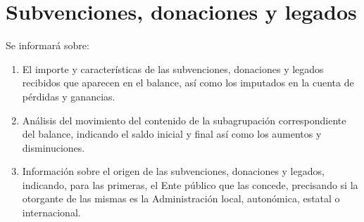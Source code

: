 \documentclass[11pt,a4paper]{article}
\begin{document}
\section{Subvenciones, donaciones y legados}
Se informará sobre:
\begin{enumerate}
 \item El importe y características de las subvenciones, donaciones y legados recibidos que aparecen en el balance, así como los imputados en la cuenta de pérdidas y ganancias.

 \item Análisis del movimiento del contenido de la subagrupación correspondiente del balance, indicando el saldo inicial y final así como los aumentos y disminuciones.

 \item Información sobre el origen de las subvenciones, donaciones y legados, indicando, para las primeras, el Ente público que las concede, precisando si la otorgante de las mismas es la Administración local, autonómica, estatal o internacional.
\end{enumerate}
\end{document}
